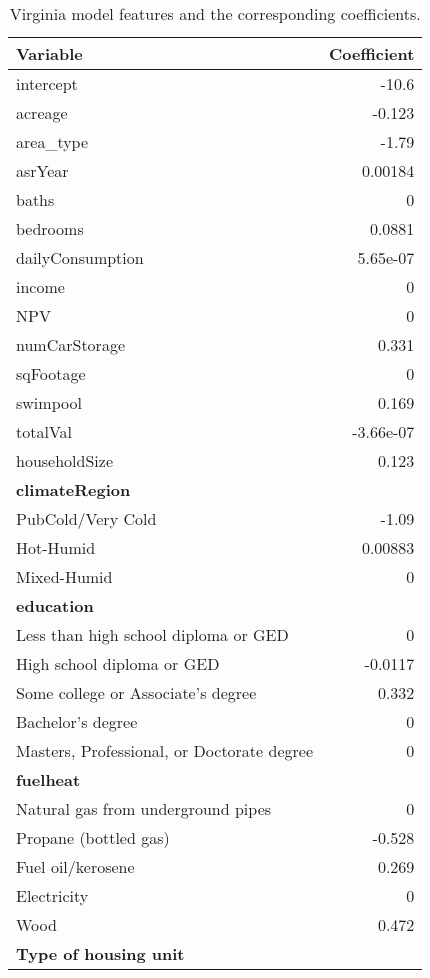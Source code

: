 \begin{table}[H]
	\centering
	\scriptsize
    \caption{Virginia model features and the corresponding coefficients.}
	\begin{tabular}{|p{6cm}|r|}
		\hline
		Variable & Coefficient \\ 
		\hline
		\hline
		intercept & -10.6 \\ 
		\hline
		acreage & -0.123 \\ 
		\hline
		area\_type & -1.79 \\ 
		\hline
		asrYear & 0.00184 \\
		\hline 
		baths &    0 \\ 
		\hline
		bedrooms & 0.0881 \\ 
		\hline
		dailyConsumption & 5.65e-07 \\ 
		\hline
		income &    0 \\ 
		\hline
		NPV &    0 \\ 
		\hline
		numCarStorage & 0.331 \\ 
		\hline
		sqFootage &    0 \\ 
		\hline
		swimpool & 0.169 \\ 
		\hline
		totalVal & -3.66e-07 \\  
		\hline
		householdSize & 0.123 \\ 
		\hline
		\textbf{climateRegion} & \\
		PubCold/Very Cold & -1.09 \\ 
		Hot-Humid & 0.00883 \\ 
		Mixed-Humid &    0 \\ 
		\hline
		\textbf{education} & \\
		Less than high school diploma or GED & 0 \\
		High school diploma or GED  & -0.0117 \\ 
		Some college or Associate’s degree  & 0.332 \\ 
		Bachelor’s degree  &    0 \\ 
		Masters, Professional, or Doctorate degree  &    0 \\ 
		\hline
		\textbf{fuelheat} & \\
		Natural gas from underground pipes  & 0 \\ 
		Propane (bottled gas)  & -0.528 \\ 
		Fuel oil/kerosene  & 0.269 \\ 
		Electricity  &    0 \\ 
		Wood  & 0.472 \\ 
		\hline
		\textbf{Type of housing unit} & \\

\end{tabular}
\end{table}
